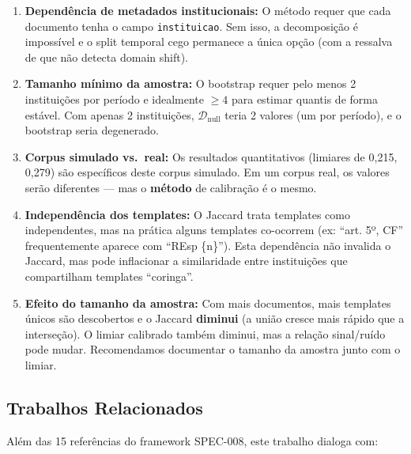 \documentclass[12pt,a4paper]{article}
\theoremstyle{remark}
\begin{document}
\begin{enumerate}[label=(\roman*), nosep]
  \item \textbf{Dependência de metadados institucionais:} O método requer que cada documento tenha o campo \texttt{instituicao}. Sem isso, a decomposição é impossível e o split temporal cego permanece a única opção (com a ressalva de que não detecta domain shift).
  \item \textbf{Tamanho mínimo da amostra:} O bootstrap requer pelo menos 2 instituições por período e idealmente $\geq 4$ para estimar quantis de forma estável. Com apenas 2 instituições, $\mathcal{D}_{\text{null}}$ teria 2 valores (um por período), e o bootstrap seria degenerado.
  \item \textbf{Corpus simulado vs.\ real:} Os resultados quantitativos (limiares de 0,215, 0,279) são específicos deste corpus simulado. Em um corpus real, os valores serão diferentes — mas o \textbf{método} de calibração é o mesmo.
  \item \textbf{Independência dos templates:} O Jaccard trata templates como independentes, mas na prática alguns templates co-ocorrem (ex: ``art. 5º, CF'' frequentemente aparece com ``REsp \{n\}''). Esta dependência não invalida o Jaccard, mas pode inflacionar a similaridade entre instituições que compartilham templates ``coringa''.
  \item \textbf{Efeito do tamanho da amostra:} Com mais documentos, mais templates únicos são descobertos e o Jaccard \textbf{diminui} (a união cresce mais rápido que a interseção). O limiar calibrado também diminui, mas a relação sinal/ruído pode mudar. Recomendamos documentar o tamanho da amostra junto com o limiar.
\end{enumerate}

\subsection{Trabalhos Relacionados}

Além das 15 referências do framework SPEC-008, este trabalho dialoga com:
\end{document}
